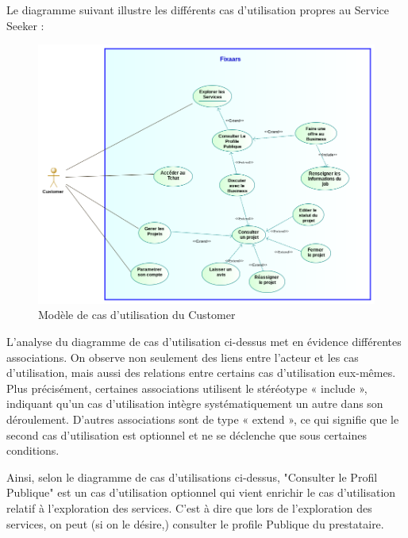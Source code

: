 \begin{enumerate}
    \vspace{0.39cm}
    
    Le diagramme suivant illustre les différents cas d'utilisation propres au Service Seeker :

    \vspace{0.39cm}
        
    \begin{figure}[H]
    \begin{center}
    \includegraphics[width=17cm]{assets/diagrams/CustomerUC.png}
    \end{center}
    \caption{Modèle de cas d'utilisation du Customer}
    \end{figure}
    
    \vspace{0.39cm}

    L’analyse du diagramme de cas d’utilisation ci-dessus met en évidence différentes associations. On observe non seulement des liens entre l’acteur et les cas d’utilisation, mais aussi des relations entre certains cas d’utilisation eux-mêmes. Plus précisément, certaines associations utilisent le stéréotype « include », indiquant qu’un cas d’utilisation intègre systématiquement un autre dans son déroulement. D’autres associations sont de type « extend », ce qui signifie que le second cas d’utilisation est optionnel et ne se déclenche que sous certaines conditions.

    \vspace{0.39cm}

    Ainsi, selon le diagramme de cas d'utilisations ci-dessus, "Consulter le Profil Publique" est un cas d'utilisation optionnel qui vient enrichir le cas d'utilisation relatif à l'exploration des services. C'est à dire que lors de l'exploration des services, on peut (si on le désire,) consulter le profile Publique du prestataire. 


\end{enumerate}
